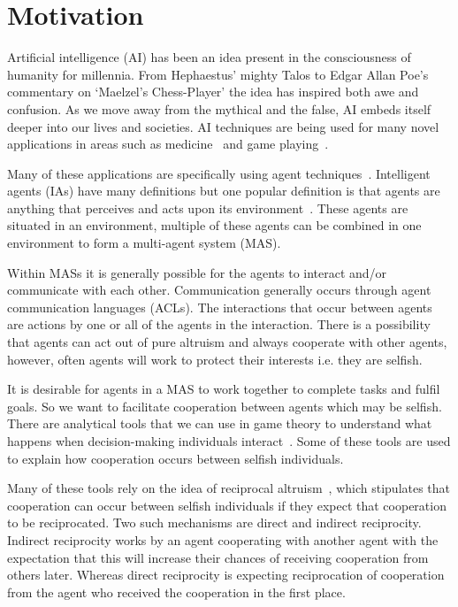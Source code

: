 \documentclass[]{final_report}
\begin{document}
\section{Motivation}
Artificial intelligence (AI) has been an idea present in the consciousness of humanity for millennia. From Hephaestus' mighty Talos to Edgar Allan Poe's commentary on `Maelzel's Chess-Player' the idea has inspired both awe and confusion. As we move away from the mythical and the false, AI embeds itself deeper into our lives and societies. AI techniques are being used for many novel applications in areas such as medicine~\cite{glaucoma} and game playing~\cite{alphago}.\par
Many of these applications are specifically using agent techniques~\cite{silverman2015systems, mvfcec, brockman2016openai}. Intelligent agents (IAs) have many definitions but one popular definition is that agents are anything that perceives and acts upon its environment~\cite{russell2016artificial}. These agents are situated in an environment, multiple of these agents can be combined in one environment to form a multi-agent system (MAS).\par
Within MASs it is generally possible for the agents to interact and/or communicate with each other. Communication generally occurs through agent communication languages (ACLs). The interactions that occur between agents are actions by one or all of the agents in the interaction. There is a possibility that agents can act out of pure altruism and always cooperate with other agents, however, often agents will work to protect their interests i.e. they are selfish.\par
It is desirable for agents in a MAS to work together to complete tasks and fulfil goals. So we want to facilitate cooperation between agents which may be selfish. There are analytical tools that we can use in game theory to understand what happens when decision-making individuals interact~\cite{myerson2013game}. Some of these tools are used to explain how cooperation occurs between selfish individuals.\par
Many of these tools rely on the idea of reciprocal altruism~\cite{trivers1971evolution}, which stipulates that cooperation can occur between selfish individuals if they expect that cooperation to be reciprocated. Two such mechanisms are direct and indirect reciprocity. Indirect reciprocity works by an agent cooperating with another agent with the expectation that this will increase their chances of receiving cooperation from others later. Whereas direct reciprocity is expecting reciprocation of cooperation from the agent who received the cooperation in the first place.\par
\end{document}
